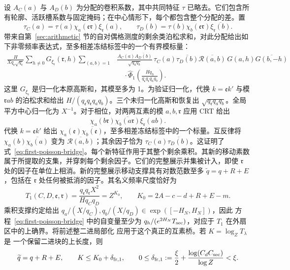 \documentclass[11pt,a4paper]{article}
\numberwithin{equation}{section}
\numberwithin{figure}{section}
\theoremstyle{definition}
\theoremstyle{remark}
\begin{document}
设 \(A_C(a)\) 与 \(A_D(b)\) 为分配的卷积系数，其中共同特征 \(\tau\) 已略去。它们包含所有轮廓、活跃槽系数与固定掩码；在中心情形下，每个都包含整个分配的差。置
\[
 \tau_C(a)=\tau(a)\chi_a(\mathfrak e\mathfrak r)
                       \xi_{\mathfrak r}(a),\qquad
 \tau_D(b)=\tau(b)\chi_b(\mathfrak e\mathfrak r)
                       \overline{\xi_{\mathfrak r}(b)}.
\]
带来自第~\ref{sec:arithmetic} 节的自对偶格测度的剩余类泊松求和，对此分配给出如下非零频率表达式，至多相差冻结标签中的一个有界模标量：
\begin{equation}
 \begin{split}
 \frac{H}{Xq_{\mathfrak e}\sqrt{q_{\mathfrak r}}}
 \sum_{h\ne0}G_{\xi_{\mathfrak r}}(\mathfrak r,h)
 \sum_{(a,b)=1}
 &\frac{A_C(a)\overline{A_D(b)}}{\sqrt{q_aq_b}}\,
 \tau_C(a)\overline{\tau_D(b)}
 \overline{\mathcal R(a,b)}\,
 G(a,h)\overline{G(b,-h)}
 \\
 &\quad\cdot
 \widehat\Phi_1\left(
    \frac{Hq_h}{q_{\mathfrak e}q_{\mathfrak r}q_aq_b}
                    \right).
 \end{split}
 \label{eq:first-poisson-bridge}
\end{equation}
这里 \(G_{\xi_{\mathfrak r}}\) 是归一化本原高斯和，其模至多为 1。为验证归一化，代换 \(k=\mathfrak e k'\) 与模 \(\mathfrak r ab\) 的泊松求和给出 \(H/(q_{\mathfrak e}q_{\mathfrak r}q_aq_b)\)。三个未归一化高斯和恢复出 \(\sqrt{q_{\mathfrak r}q_aq_b}\)。全局平方中心归一化为 \(X^{-1}\)。对于相位，对两两互素的模 \(a,b,\mathfrak r\) 应用 CRT 给出
\[
 \chi_a(b\mathfrak r)\overline{\chi_b(a\mathfrak r)}
       \xi_{\mathfrak r}(ab).
\]
代换 \(k=\mathfrak e k'\) 给出 \(\chi_a(\mathfrak e)\overline{\chi_b(\mathfrak e)}\)，至多相差冻结标签中的一个标量。互反律将 \(\chi_a(b)\overline{\chi_b(a)}\) 变为 \(\overline{\mathcal R(a,b)}\)；其余因子恰为 \(\tau_C(a)\overline{\tau_D(b)}\)。这证明了式~\eqref{eq:first-poisson-bridge}。每个新特征作用于其整个剩余乘积。其新的移动素数属于所提取的支集，并穿刺每个剩余因子。它们的完整展示并集被计入，即使 \(\mathfrak r\) 处的因子在单位上相消。新的完整展示移动支撑具有对数范数至多
\(\widetilde q=q+R+E\)，包括在
\(\mathfrak r\) 处任何被抵消的因子。其名义频率尺度恰好为
\[
 T_1(C,D,\mathfrak e,\mathfrak r)
 =\frac{q_{\mathfrak e}q_{\mathfrak r}X^2}
        {Hq_Cq_D}=Z^{K_0},
 \qquad K_0=2A-c-d+R+E-m.
\]
乘积支撑约定给出
\(q_a/(X/q_C),q_b/(X/q_D)\in\exp([-H_N,H_N])\)，因此
方程~\eqref{eq:first-poisson-bridge} 中的自变量至少为
\(q_h/(e^{2H_N}T_{\rm sec})\)，对应于 \(T_1\) 在外扇区中的上确界。将前述整二进局部化
应用于这个真正的互素桥。若 \(K=\log_ZT_\lambda\) 是
一个保留二进块的上长度，则
\begin{equation}
 \widetilde q=q+R+E,\qquad
 K\le K_0+\delta_{{\rm fr},1},\qquad
 0\le\delta_{{\rm fr},1}:=\frac\xi2+
       \frac{\log(C_dC_{\rm sec})}{\log Z}<\xi.
 \label{old-eq:2.3}
\end{equation}
\end{document}
